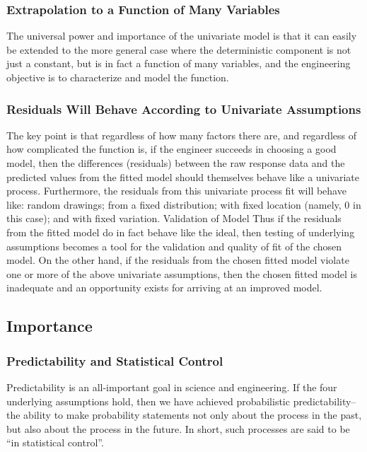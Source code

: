 \documentclass[]{book}
\theoremstyle{definition}
\theoremstyle{definition}
\theoremstyle{definition}
\theoremstyle{remark}
\begin{document}
\subsubsection{Extrapolation to a Function of Many
Variables}\label{extrapolation-to-a-function-of-many-variables}

The universal power and importance of the univariate model is that it
can easily be extended to the more general case where the deterministic
component is not just a constant, but is in fact a function of many
variables, and the engineering objective is to characterize and model
the function.

\subsubsection{Residuals Will Behave According to Univariate
Assumptions}\label{residuals-will-behave-according-to-univariate-assumptions}

The key point is that regardless of how many factors there are, and
regardless of how complicated the function is, if the engineer succeeds
in choosing a good model, then the differences (residuals) between the
raw response data and the predicted values from the fitted model should
themselves behave like a univariate process. Furthermore, the residuals
from this univariate process fit will behave like: random drawings; from
a fixed distribution; with fixed location (namely, 0 in this case); and
with fixed variation. Validation of Model Thus if the residuals from the
fitted model do in fact behave like the ideal, then testing of
underlying assumptions becomes a tool for the validation and quality of
fit of the chosen model. On the other hand, if the residuals from the
chosen fitted model violate one or more of the above univariate
assumptions, then the chosen fitted model is inadequate and an
opportunity exists for arriving at an improved model.

\subsection{Importance}\label{importance}

\subsubsection{Predictability and Statistical
Control}\label{predictability-and-statistical-control}

Predictability is an all-important goal in science and engineering. If
the four underlying assumptions hold, then we have achieved
probabilistic predictability--the ability to make probability statements
not only about the process in the past, but also about the process in
the future. In short, such processes are said to be ``in statistical
control''.
\end{document}
